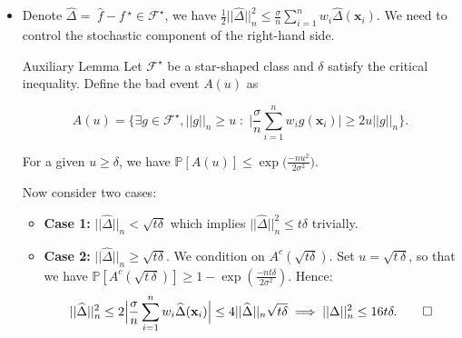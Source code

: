 \documentclass[11pt]{beamer}
\newcommand{\Prob}{\mathbb{P}}
\newcommand{\bx}{\mathbf{x}}
\newcommand{\cF}{\mathcal{F}}
\newcommand{\fstar}{f\,^\star}
\newcommand{\fhat}{\widehat{f}}
\begin{document}
	
		\begin{frame}
		\begin{itemize}
		\item Denote $\widehat\Delta = \; \fhat - \fstar \in \cF^\star$, we have $\frac{1}{2}||\widehat\Delta||_n^2 \leq \frac{\sigma}{n}\sum_{i = 1}^{n}w_i \widehat\Delta (\bx_i)$.  We need to control the stochastic component of the right-hand side.
		
		\begin{block}{Auxiliary Lemma}
		Let $\cF^\star$ be a star-shaped class and $\delta$ satisfy the critical inequality.  Define the bad event $A(u)$ as
		\begin{small}
		
		\vspace{-0.3cm}
		\begin{equation*}
		A(u) = \Bigg\{\exists g \in \cF^\star, ||g||_n \geq u \;:\; \Big|\frac{\sigma}{n}\sum_{i = 1}^{n} w_i g(\bx_i)\Big|\geq 2u ||g||_n\Bigg\}.
		\end{equation*}
		\end{small}
		\vspace{-0.3cm}
		
		For a given $u \geq \delta$, we have 
		$\Prob[A(u)]\leq \exp\big(\frac{-nu^2}{2\sigma^2}\big)$.
		\end{block}
		 Now consider two cases:
		\begin{itemize}
			\item \textbf{Case 1:} $||\widehat\Delta||_n < \sqrt{t\delta}$ which implies $||\widehat\Delta||_n^2\leq t\delta$ trivially.
			\item \textbf{Case 2:} $||\widehat\Delta||_n \geq \sqrt{t\delta}$.  We condition on $A^c(\sqrt{t\delta})$. 		Set $u = \sqrt{t\,\delta}$, so that we have $\Prob[A^c(\sqrt{t\,\delta})]\geq 1 - \exp(\frac{-nt\delta}{2\sigma^2})$. Hence:
			\begin{equation*}
				||\widehat\Delta||_n^2 \leq 2\Big|\frac{\sigma}{n}\sum_{i = 1}^{n}w_i \widehat\Delta (\bx_i)\Big| \leq 4||\widehat\Delta||_n\sqrt{t\delta} \implies  ||\Delta||_n^2 \leq 16t\delta.\qed
			\end{equation*}
		\end{itemize}
	\end{itemize}
	\end{frame}
\end{document}
